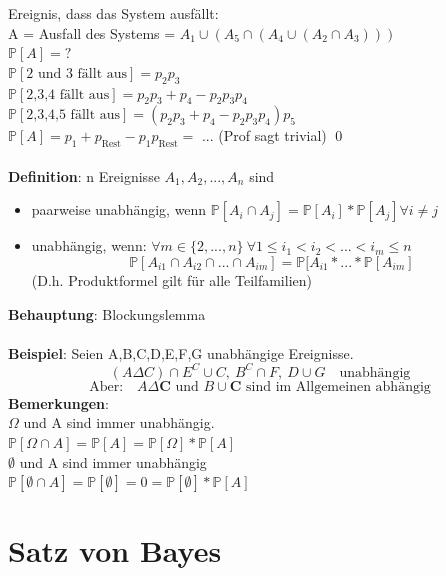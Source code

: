 Ereignis, dass das System ausfällt:\\
A = Ausfall des Systems = $A_1 \cup (A_5\cap (A_4 \cup (A_2 \cap A_3)))$\smallskip\\
$\mathds{P}[A] = ?$\\
$\mathds{P}[\text{2 und 3 fällt aus}] = p_2p_3$\smallskip\\
$\mathds{P}[\text{2,3,4 fällt aus}] = p_2p_3+p_4 -p_2p_3p_4$\smallskip\\
$\mathds{P}[\text{2,3,4,5 fällt aus}] = (p_2p_3+p_4-p_2p_3p_4)p_5$\smallskip\\
$\mathds{P}[A] = p_1 + p_\text{Rest} - p_1p_\text{Rest} =$ ... (Prof sagt trivial) \qed\\\\
\textbf{Definition}: n Ereignisse $A_1, A_2,...,A_n$ sind
\begin{itemize}
	\item paarweise unabhängig, wenn $\mathds{P}[A_i \cap A_j] = \mathds{P}[A_i] * \mathds{P}[A_j] \forall i \neq j$
	\item unabhängig, wenn: $\forall m \in \{2,...,n\} \: \forall 1 \leq i_1 < i_2 <...<i_m\leq n$
	$$\mathds{P}[A_{i1}\cap A_{i2}\cap ... \cap A_{im}] = \mathds{P}[A_{i1}* ... * \mathds{P}[A_{im}]$$
	(D.h. Produktformel gilt für alle Teilfamilien)
\end{itemize} 
\newpage
\textbf{Behauptung}: Blockungslemma\\\\
\textbf{Beispiel}: Seien A,B,C,D,E,F,G unabhängige Ereignisse.
$$(A \Delta C) \cap E^C \cup C, \: B^C\cap F,\: D\cup G \quad \text{unabhängig}$$ 
$$\text{Aber:} \quad A \Delta \mathbf{C} \text{ und } B \cup \mathbf{C} \text{ sind im Allgemeinen abhängig}$$
\textbf{Bemerkungen}:\medskip\\
$\Omega$ und A sind immer unabhängig.\medskip\\
$\mathds{P}[\Omega \cap A] = \mathds{P}[A]=\mathds{P}[\Omega]*\mathds{P}[A]$\medskip\\
$\emptyset$ und A sind immer unabhängig\medskip\\
$\mathds{P}[\emptyset \cap A] = \mathds{P}[\emptyset]=0=\mathds{P}[\emptyset]*\mathds{P}[A]$
\chapter{Satz von Bayes}
